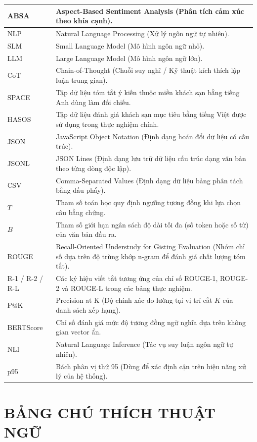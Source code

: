 \documentclass[12pt,a4paper]{report}
\begin{document}
\begin{longtable}{|p{}|p{}|}
ABSA & Aspect-Based Sentiment Analysis (Phân tích cảm xúc theo khía cạnh). \\ \hline
NLP & Natural Language Processing (Xử lý ngôn ngữ tự nhiên). \\ \hline
SLM & Small Language Model (Mô hình ngôn ngữ nhỏ). \\ \hline
LLM & Large Language Model (Mô hình ngôn ngữ lớn). \\ \hline
CoT & Chain-of-Thought (Chuỗi suy nghĩ / Kỹ thuật kích thích lập luận trung gian). \\ \hline
SPACE & Tập dữ liệu tóm tắt ý kiến thuộc miền khách sạn bằng tiếng Anh dùng làm đối chiếu. \\ \hline
HASOS & Tập dữ liệu đánh giá khách sạn mục tiêu bằng tiếng Việt được sử dụng trong thực nghiệm chính. \\ \hline
JSON & JavaScript Object Notation (Định dạng hoán đổi dữ liệu có cấu trúc). \\ \hline
JSONL & JSON Lines (Định dạng lưu trữ dữ liệu cấu trúc dạng văn bản theo từng dòng độc lập). \\ \hline
CSV & Comma-Separated Values (Định dạng dữ liệu bảng phân tách bằng dấu phẩy). \\ \hline
$T$ & Tham số toán học quy định ngưỡng tương đồng khi lựa chọn câu bằng chứng. \\ \hline
$B$ & Tham số giới hạn ngân sách độ dài tối đa (số token hoặc số từ) của văn bản đầu ra. \\ \hline
ROUGE & Recall-Oriented Understudy for Gisting Evaluation (Nhóm chỉ số dựa trên độ trùng khớp n-gram để đánh giá chất lượng tóm tắt). \\ \hline
R-1 / R-2 / R-L & Các ký hiệu viết tắt tương ứng của chỉ số ROUGE-1, ROUGE-2 và ROUGE-L trong các bảng thực nghiệm. \\ \hline
P@K & Precision at K (Độ chính xác đo lường tại vị trí cắt $K$ của danh sách xếp hạng). \\ \hline
BERTScore & Chỉ số đánh giá mức độ tương đồng ngữ nghĩa dựa trên không gian vector ẩn. \\ \hline
NLI & Natural Language Inference (Tác vụ suy luận ngôn ngữ tự nhiên). \\ \hline
p95 & Bách phân vị thứ 95 (Dùng để xác định cận trên hiệu năng xử lý của hệ thống). \\ \hline\end{longtable}
\renewcommand{\arraystretch}{1.0}
\chapter*{BẢNG CHÚ THÍCH THUẬT NGỮ}
{}
\end{document}
